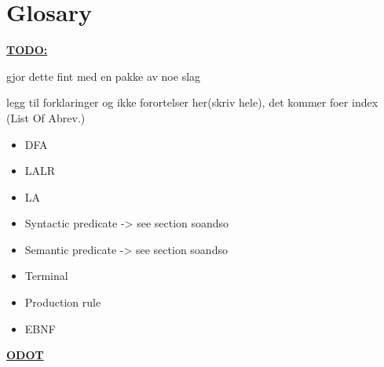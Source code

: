 \chapter{Glosary}

\underline{\textbf{\LARGE TODO:}} 

gjor dette fint med en pakke av noe slag

legg til forklaringer og ikke forortelser her(skriv hele), det kommer foer index (List Of Abrev.)

\begin{itemize}
\item DFA 
\item LALR
\item LA
\item Syntactic predicate -> see section soandso
\item Semantic predicate -> see section soandso
\item Terminal
\item Production rule
\item EBNF
\end{itemize}

\underline{\textbf{\LARGE ODOT}} 